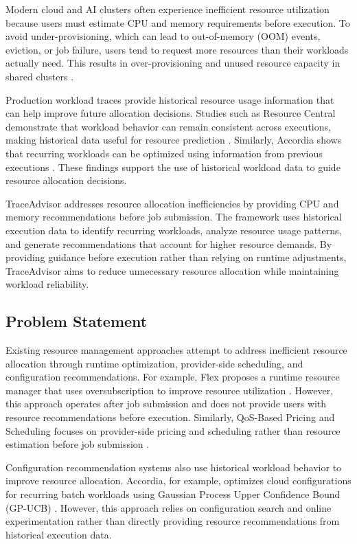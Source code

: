 \documentclass{IEEEtran}
\begin{document}
Modern cloud and AI clusters often experience inefficient resource utilization because users must estimate CPU and memory requirements before execution. To avoid under-provisioning, which can lead to out-of-memory (OOM) events, eviction, or job failure, users tend to request more resources than their workloads actually need. This results in over-provisioning and unused resource capacity in shared clusters \cite{ref1}.

Production workload traces provide historical resource usage information that can help improve future allocation decisions. Studies such as Resource Central demonstrate that workload behavior can remain consistent across executions, making historical data useful for resource prediction \cite{ref2}. Similarly, Accordia shows that recurring workloads can be optimized using information from previous executions \cite{ref3}. These findings support the use of historical workload data to guide resource allocation decisions.

TraceAdvisor addresses resource allocation inefficiencies by providing CPU and memory recommendations before job submission. The framework uses historical execution data to identify recurring workloads, analyze resource usage patterns, and generate recommendations that account for higher resource demands. By providing guidance before execution rather than relying on runtime adjustments, TraceAdvisor aims to reduce unnecessary resource allocation while maintaining workload reliability.

\subsection{Problem Statement}\label{sec:1.2}

Existing resource management approaches attempt to address inefficient resource allocation through runtime optimization, provider-side scheduling, and configuration recommendations. For example, Flex proposes a runtime resource manager that uses oversubscription to improve resource utilization \cite{ref1}. However, this approach operates after job submission and does not provide users with resource recommendations before execution. Similarly, QoS-Based Pricing and Scheduling focuses on provider-side pricing and scheduling rather than resource estimation before job submission \cite{ref4}.

Configuration recommendation systems also use historical workload behavior to improve resource allocation. Accordia, for example, optimizes cloud configurations for recurring batch workloads using Gaussian Process Upper Confidence Bound (GP-UCB) \cite{ref3}. However, this approach relies on configuration search and online experimentation rather than directly providing resource recommendations from historical execution data.
\end{document}

